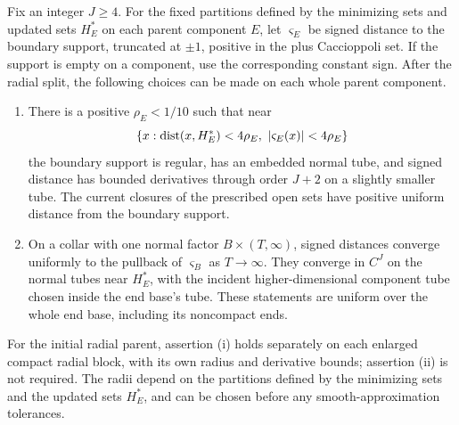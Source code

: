 \begin{lemma}\label{regular:count-sets}
Fix an integer $J\ge4$. For the fixed partitions defined by the minimizing sets and updated
sets $H_E^*$ on each parent component $E$, let
$\varsigma_E$ be signed distance to the boundary support, truncated
at $\pm1$, positive in the plus Caccioppoli set.  If the support is empty on a
component, use the corresponding constant sign.  After the radial split,
the following choices can be made on each whole parent component.
\begin{enumerate}[label=(\roman*)]
\item There is a positive $\rho_E<1/10$ such that near
\[
 \{x:\dist(x,H_E^*)<4\rho_E,\ |\varsigma_E(x)|<4\rho_E\}
\]
the boundary support is regular, has an embedded normal tube, and signed
distance has bounded derivatives through order $J+2$ on a slightly
smaller tube.  The current closures of the prescribed open sets have positive uniform
distance from the boundary support.
\item On a collar with one normal factor $B\times(T,\infty)$, signed distances
converge uniformly to the pullback of $\varsigma_B$ as $T\to\infty$.
They converge in $C^J$ on the normal tubes near $H_E^*$, with the incident higher-dimensional component tube chosen
inside the end base's tube.  These statements are uniform over the whole
end base, including its noncompact ends.
\end{enumerate}
For the initial radial parent, assertion \textup{(i)} holds separately
on each enlarged compact radial block, with its own radius and derivative
bounds; assertion \textup{(ii)} is not required.
The radii depend on the partitions defined by the minimizing sets and the updated sets $H_E^*$, and can
be chosen before any smooth-approximation tolerances.
\end{lemma}

